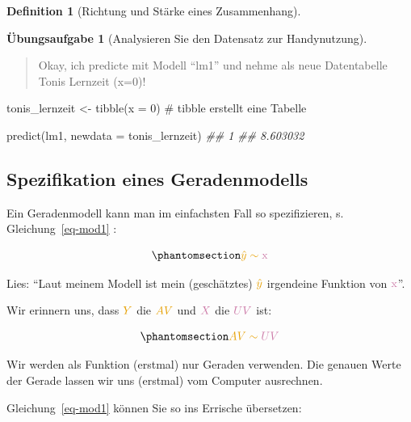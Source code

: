 \documentclass[
  a4paper,
  DIV=11]{scrreprt}
\newenvironment{Shaded}{\begin{snugshade}}{\end{snugshade}}
\newcommand{\AttributeTok}[1]{\textcolor[rgb]{0.40,0.45,0.13}{#1}}
\newcommand{\CommentTok}[1]{\textcolor[rgb]{0.37,0.37,0.37}{#1}}
\newcommand{\DecValTok}[1]{\textcolor[rgb]{0.68,0.00,0.00}{#1}}
\newcommand{\DocumentationTok}[1]{\textcolor[rgb]{0.37,0.37,0.37}{\textit{#1}}}
\newcommand{\FunctionTok}[1]{\textcolor[rgb]{0.28,0.35,0.67}{#1}}
\newcommand{\NormalTok}[1]{\textcolor[rgb]{0.00,0.23,0.31}{#1}}
\newcommand{\OtherTok}[1]{\textcolor[rgb]{0.00,0.23,0.31}{#1}}
\theoremstyle{definition}
\newtheorem{exercise}{Übungsaufgabe}[chapter]
\theoremstyle{definition}
\theoremstyle{definition}
\newtheorem{definition}{Definition}[chapter]
\theoremstyle{remark}
\begin{document}
\begin{definition}[Richtung und Stärke eines
Zusammenhang]
\begin{exercise}[Analysieren Sie den Datensatz zur
Handynutzung]
\begin{quote}
{} Okay, ich predicte mit Modell ``lm1'' und nehme als neue
Datentabelle Tonis Lernzeit (x=0)!
\end{quote}

\begin{Shaded}
\begin{Highlighting}[]
\NormalTok{tonis\_lernzeit }\OtherTok{\textless{}{-}} \FunctionTok{tibble}\NormalTok{(}\AttributeTok{x =} \DecValTok{0}\NormalTok{)  }\CommentTok{\# \textasciigrave{}tibble\textasciigrave{} erstellt eine Tabelle}
\end{Highlighting}
\end{Shaded}

\begin{Shaded}
\begin{Highlighting}[]
\FunctionTok{predict}\NormalTok{(lm1, }\AttributeTok{newdata =}\NormalTok{ tonis\_lernzeit)}
\DocumentationTok{\#\#        1 }
\DocumentationTok{\#\# 8.603032}
\end{Highlighting}
\end{Shaded}

\subsection{Spezifikation eines
Geradenmodells}\label{spezifikation-eines-geradenmodells}

Ein Geradenmodell kann man im einfachsten Fall so spezifizieren, s.
Gleichung~\ref{eq-mod1} :

\begin{equation}\phantomsection\label{eq-mod1}{\color{ycol}{\hat{y}} \sim \color{xcol}{\text{x}}}\end{equation}

Lies: ``Laut meinem Modell ist mein (geschätztes)
\(\color{ycol}{\hat{y}}\) irgendeine Funktion von
\(\color{xcol}{\text{x}}\)''.

Wir erinnern uns, dass \(\color{ycol}{Y}\) die \(\color{ycol}{AV}\) und
\(\color{xcol}{X}\) die \(\color{xcol}{UV}\) ist:

\begin{equation}\phantomsection\label{eq-mod1}{\color{ycol}{AV} \sim \color{xcol}{UV}}\end{equation}

Wir werden als Funktion (erstmal) nur Geraden verwenden. Die genauen
Werte der Gerade lassen wir uns (erstmal) vom Computer ausrechnen.

Gleichung~\ref{eq-mod1} können Sie so ins Errische übersetzen:


\end{exercise}
\end{definition}
\end{document}
